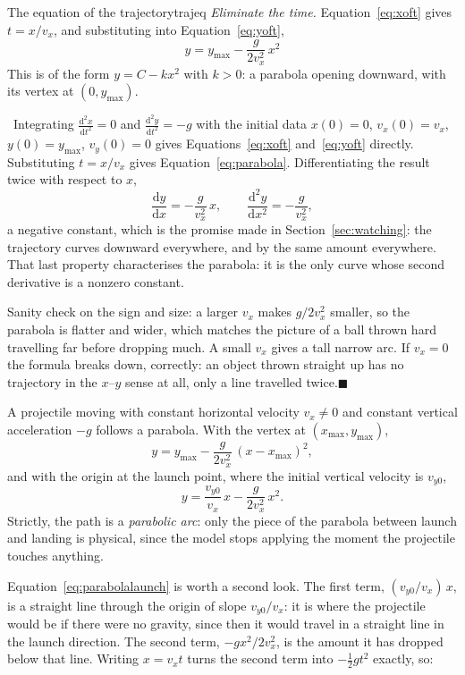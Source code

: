 \documentclass[11pt,twoside,openany]{book}
\newcommand{\dd}{\mathrm{d}}
\newcommand{\deriv}[2]{\frac{\dd #1}{\dd #2}}
\newcommand{\dderiv}[2]{\frac{\dd^2 #1}{\dd #2^2}}
\newcounter{check}[chapter]
\newcommand{\viewtag}[3]{\fcolorbox{#2}{#3}{\footnotesize\textbf{\textcolor{#2}{#1}}}}
\newcommand{\calctag}{\viewtag{Calculus}{calccol}{calcpale}}
\newcommand{\calc}{\par\medskip\noindent\calctag\ }
\newcommand{\qed}{\hfill$\blacksquare$}
\begin{document}
\begin{example}{The equation of the trajectory}{trajeq}
\emph{Eliminate the time.} Equation~\eqref{eq:xoft} gives $t = x/v_x$, and substituting into Equation~\eqref{eq:yoft},
\begin{equation}
\boxed{\;y = y_{\max} - \frac{g}{2v_x^{2}}\,x^{2}\;}
\label{eq:parabola}
\end{equation}
This is of the form $y = C - kx^2$ with $k > 0$: a parabola opening downward, with its vertex at $(0, y_{\max})$.

\calc Integrating $\dderiv{x}{t} = 0$ and $\dderiv{y}{t} = -g$ with the initial data $x(0) = 0$, $v_x(0) = v_x$, $y(0) = y_{\max}$, $v_y(0) = 0$ gives Equations~\eqref{eq:xoft} and~\eqref{eq:yoft} directly. Substituting $t = x/v_x$ gives Equation~\eqref{eq:parabola}. Differentiating the result twice with respect to $x$,
\[
\deriv{y}{x} = -\frac{g}{v_x^{2}}\,x, \qquad \dderiv{y}{x} = -\frac{g}{v_x^{2}},
\]
a negative constant, which is the promise made in Section~\ref{sec:watching}: the trajectory curves downward everywhere, and by the same amount everywhere. That last property characterises the parabola: it is the only curve whose second derivative is a nonzero constant.

Sanity check on the sign and size: a larger $v_x$ makes $g/2v_x^2$ smaller, so the parabola is flatter and wider, which matches the picture of a ball thrown hard travelling far before dropping much. A small $v_x$ gives a tall narrow arc. If $v_x = 0$ the formula breaks down, correctly: an object thrown straight up has no trajectory in the $x$--$y$ sense at all, only a line travelled twice.\qed
\end{example}

\begin{keyidea}
A projectile moving with constant horizontal velocity $v_x \ne 0$ and constant vertical acceleration $-g$ follows a parabola. With the vertex at $(x_{\max}, y_{\max})$,
\[
y = y_{\max} - \frac{g}{2v_x^{2}}\,(x - x_{\max})^{2},
\]
and with the origin at the launch point, where the initial vertical velocity is $v_{y0}$,
\begin{equation}
y = \frac{v_{y0}}{v_x}\,x - \frac{g}{2v_x^{2}}\,x^{2}.
\label{eq:parabolalaunch}
\end{equation}
Strictly, the path is a \emph{parabolic arc}: only the piece of the parabola between launch and landing is physical, since the model stops applying the moment the projectile touches anything.
\end{keyidea}

Equation~\eqref{eq:parabolalaunch} is worth a second look. The first term, $ (v_{y0}/v_x)\,x$, is a straight line through the origin of slope $v_{y0}/v_x$: it is where the projectile would be if there were no gravity, since then it would travel in a straight line in the launch direction. The second term, $-g x^2/2v_x^2$, is the amount it has dropped below that line. Writing $x = v_x t$ turns the second term into $-\tfrac12 g t^2$ exactly, so:
\end{document}
